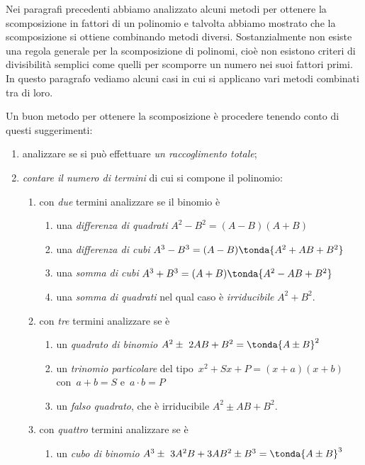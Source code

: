 Nei paragrafi precedenti abbiamo analizzato alcuni metodi per ottenere
la scomposizione in fattori di un polinomio e talvolta abbiamo mostrato
che la scomposizione si ottiene combinando metodi diversi.
Sostanzialmente non esiste una regola generale per la scomposizione di
polinomi, cioè non esistono criteri di divisibilità semplici come
quelli per scomporre un numero nei suoi fattori primi. In questo
paragrafo vediamo alcuni casi in cui si applicano vari metodi combinati
tra di loro.

Un buon metodo per ottenere la scomposizione è procedere tenendo conto
di questi suggerimenti:


\begin{enumerate}
\item analizzare se si può effettuare \emph{un raccoglimento totale};
\item \emph{contare il numero di termini} di cui si compone il 
polinomio:
\begin{enumerate}
\item con \emph{due} termini analizzare se il binomio è
  \begin{enumerate}
\item una \emph{differenza di quadrati} 
  \(A^{2}-B^{2}=(A-B)(A+B)\)
\item una \emph{differenza di cubi}
  \(A^{3}-B^{3}=(A-B)\tonda{A^{2}+AB+B^{2}}\)
\item una \emph{somma di cubi} 
  \(A^{3}+B^{3}=(A+B)\tonda{A^{2}-AB+B^{2}}\)
\item una \emph{somma di quadrati} nel qual caso è \emph{irriducibile} 
  \(A^{2}+B^{2}\).
  \end{enumerate}
\item con \emph{tre} termini analizzare se è
  \begin{enumerate}
\item un \emph{quadrato di binomio} 
  \(A^{2}\pm~2AB+B^{2}=\tonda{A\pm B}^{2}\)
\item un \emph{trinomio particolare} del tipo~\(x^2+Sx+P=(x+a)(x+b)\) \\
  con~\(a+b=S\) e~\(a\cdot b=P\)
\item un \emph{falso quadrato}, che è irriducibile 
\(A^{2}\pm AB+B^{2}\).
  \end{enumerate}
\item con \emph{quattro} termini analizzare se è
  \begin{enumerate}
\item un \emph{cubo di binomio} 
  \(A^{3}\pm~3A^{2}B+3AB^{2}\pm B^{3}=\tonda{A\pm B}^{3}\)

\end{enumerate}
\end{enumerate}
\end{enumerate}
